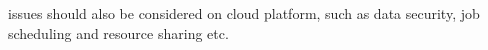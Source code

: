 issues should also be considered on cloud platform, such as data security, job scheduling and resource sharing etc.   




